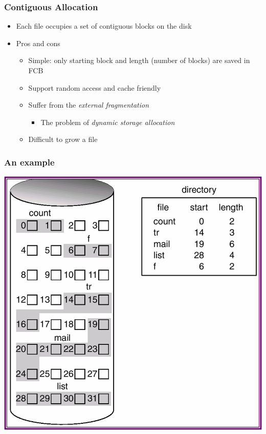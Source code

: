 \documentclass[CJKutf8,xcolor=pdftex,dvipsnames,table]{beamer}
\begin{document}
\begin{CJK*}{UTF8}{song}
  \begin{frame}
    \frametitle{Contiguous Allocation} \pause
    \begin{itemize}\parskip=0pt
    \item Each file occupies a set of contiguous blocks on the disk \pause
    \item Pros and cons \pause
      \begin{itemize}\parskip=0pt
      \item Simple: only starting block and length (number of blocks) are saved in FCB \pause
      \item Support random access and cache friendly \pause
      \item Suffer from the \emph{external fragmentation} \pause

        \begin{itemize}\parskip=0pt
        \item The problem of \emph{dynamic storage allocation} \pause
        \end{itemize}

      \item Difficult to grow a file
      \end{itemize}
    \end{itemize}
  \end{frame}
  
  \begin{frame}
    \frametitle{An example} \pause
    \begin{center}
      \includegraphics[scale=.5]{v6f12-5}
    \end{center}
  \end{frame}
  

\end{CJK*}
\end{document}
